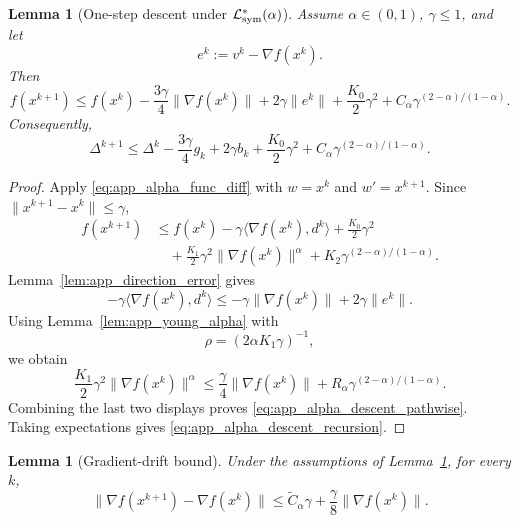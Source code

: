 \documentclass[letter,11pt]{article}
\newtheorem{lemma}[]{Lemma}
\begin{document}
\begin{lemma}[One-step descent under \(\mathcal L_{\rm sym}^*(\alpha)\)]
\label{lem:app_alpha_onestep}
Assume \(\alpha\in(0,1)\), \(\gamma\le1\), and let
\[
    e^k:=v^k-\nabla f(x^k).
\]
Then
\begin{equation}
\label{eq:app_alpha_descent_pathwise}
    f(x^{k+1})
    \le
    f(x^k)
    -\frac{3\gamma}{4}\|\nabla f(x^k)\|
    +2\gamma\|e^k\|
    +\frac{K_0}{2}\gamma^2
    +C_\alpha\gamma^{(2-\alpha)/(1-\alpha)}.
\end{equation}
Consequently,
\begin{equation}
\label{eq:app_alpha_descent_recursion}
    \Delta^{k+1}
    \le
    \Delta^k
    -\frac{3\gamma}{4}g_k
    +2\gamma b_k
    +\frac{K_0}{2}\gamma^2
    +C_\alpha\gamma^{(2-\alpha)/(1-\alpha)}.
\end{equation}
\end{lemma}

\begin{proof}
Apply \eqref{eq:app_alpha_func_diff} with \(w=x^k\) and
\(w'=x^{k+1}\). Since \(\|x^{k+1}-x^k\|\le\gamma\),
\[
\begin{aligned}
    f(x^{k+1})
    &\le
    f(x^k)
    -\gamma\langle\nabla f(x^k),d^k\rangle
    +\frac{K_0}{2}\gamma^2 \\
    &\quad
    +\frac{K_1}{2}\gamma^2\|\nabla f(x^k)\|^\alpha
    +K_2\gamma^{(2-\alpha)/(1-\alpha)}.
\end{aligned}
\]
Lemma~\ref{lem:app_direction_error} gives
\[
    -\gamma\langle\nabla f(x^k),d^k\rangle
    \le
    -\gamma\|\nabla f(x^k)\|+2\gamma\|e^k\|.
\]
Using Lemma~\ref{lem:app_young_alpha} with
\[
    \rho=(2\alpha K_1\gamma)^{-1},
\]
we obtain
\[
    \frac{K_1}{2}\gamma^2\|\nabla f(x^k)\|^\alpha
    \le
    \frac{\gamma}{4}\|\nabla f(x^k)\|
    +R_\alpha\gamma^{(2-\alpha)/(1-\alpha)}.
\]
Combining the last two displays proves
\eqref{eq:app_alpha_descent_pathwise}. Taking expectations gives
\eqref{eq:app_alpha_descent_recursion}.
\end{proof}

\begin{lemma}[Gradient-drift bound]
\label{lem:app_alpha_drift}
Under the assumptions of Lemma~\ref{lem:app_alpha_onestep}, for every \(k\),
\begin{equation}
\label{eq:app_alpha_drift_bound}
    \|\nabla f(x^{k+1})-\nabla f(x^k)\|
    \le
    \widetilde C_\alpha\gamma
    +\frac{\gamma}{8}\|\nabla f(x^k)\|.
\end{equation}
\end{lemma}
\end{document}
